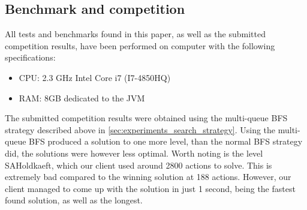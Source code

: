 \documentclass[Main]{subfiles}
\begin{document}
\subsection{Benchmark and competition}
All tests and benchmarks found in this paper, as well as the submitted
competition results, have been performed on computer with the following
specifications:

\begin{itemize}
\item CPU: 2.3 GHz Intel Core i7 (I7-4850HQ) 
\item RAM: 8GB dedicated to the JVM
\end{itemize}

The submitted competition results were obtained using the multi-queue BFS
strategy described above in \autoref{sec:experiments_search_strategy}. Using the
multi-queue BFS produced a solution to one more level, than the normal BFS
strategy did, the solutions were however less optimal. Worth noting is the level
SAHoldkaeft, which our client used around 2800 actions to solve. This is
extremely bad compared to the winning solution at 188 actions. However, our
client managed to come up with the solution in just 1 second, being the fastest
found solution, as well as the longest. 
\end{document}
